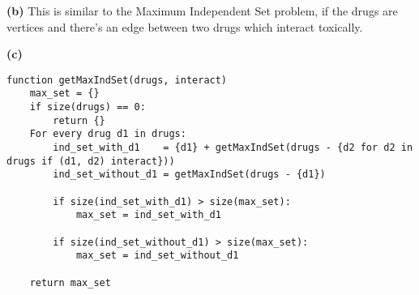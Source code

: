\documentclass[11pt,letterpaper]{article}
\renewcommand{\part}[1] {\vspace{.10in} {\bf (#1)}}
\begin{document}
\part{b}
This is similar to the Maximum Independent Set problem, if the drugs are vertices and there's an edge between two drugs which interact toxically.

\part{c}

\begin{verbatim}
function getMaxIndSet(drugs, interact)
    max_set = {}
    if size(drugs) == 0:
        return {}
    For every drug d1 in drugs:
        ind_set_with_d1    = {d1} + getMaxIndSet(drugs - {d2 for d2 in drugs if (d1, d2) interact}))
        ind_set_without_d1 = getMaxIndSet(drugs - {d1})

        if size(ind_set_with_d1) > size(max_set):
            max_set = ind_set_with_d1

        if size(ind_set_without_d1) > size(max_set):
            max_set = ind_set_without_d1

    return max_set
\end{verbatim}
\end{document}

